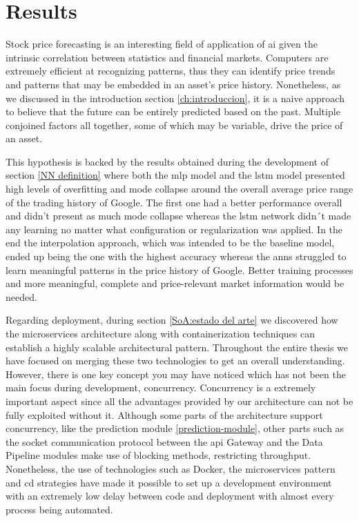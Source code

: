 \chapter{Results}
\label{res:resultados}

Stock price forecasting is an interesting field of application of \gls{ai} given the intrinsic correlation between statistics and financial markets. Computers are extremely efficient at recognizing patterns, thus they can identify price trends and patterns that may be embedded in an asset's price history. Nonetheless, as we discussed in the introduction section \ref{ch:introduccion}, it is a naive approach to believe that the future can be entirely predicted based on the past. Multiple conjoined factors all together, some of which may be variable, drive the price of an asset.

This hypothesis is backed by the results obtained during the development of section \ref{NN definition} where both the \gls{mlp} model and the \gls{lstm} model presented high levels of overfitting and mode collapse around the overall average price range of the trading history of Google. The first one had a better performance overall and didn't present as much mode collapse whereas the \gls{lstm} network didn´t made any learning no matter what configuration or regularization was applied. In the end the interpolation approach, which was intended to be the baseline model, ended up being the one with the highest accuracy whereas the \glspl{ann} struggled to learn meaningful patterns in the price history of Google. Better training processes and more meaningful, complete and price-relevant market information would be needed.

Regarding deployment, during section \ref{SoA:estado del arte} we discovered how the microservices architecture along with containerization techniques can establish a highly scalable architectural pattern. Throughout the entire thesis we have focused on merging these two technologies to get an overall understanding. However, there is one key concept you may have noticed which has not been the main focus during development, concurrency. Concurrency is a extremely important aspect since all the advantages provided by our architecture can not be fully exploited without it. Although some parts of the architecture support concurrency, like the prediction module \ref{prediction-module}, other parts such as the socket communication protocol between the \gls{api} Gateway and the Data Pipeline modules make use of blocking methods, restricting throughput. Nonetheless, the use of technologies such as Docker, the microservices pattern and \gls{cd} strategies have made it possible to set up a development environment with an extremely low delay between code and deployment with almost every process being automated.
